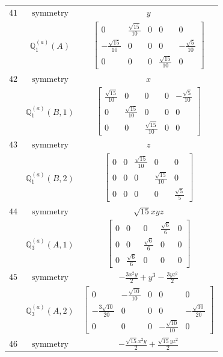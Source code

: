 \documentclass[fleqn,8pt,landscape]{jsarticle}
\begin{document}
\begin{longtable}{ccc}
$ 41 $ & $ \text{symmetry} $ & $ y $ \\
$  $ & $ \mathbb{Q}_{1}^{(a)}(A) $ & $ \begin{bmatrix} 0 & \frac{\sqrt{15}}{10} & 0 & 0 & 0 \\ - \frac{\sqrt{15}}{10} & 0 & 0 & 0 & - \frac{\sqrt{5}}{10} \\ 0 & 0 & 0 & \frac{\sqrt{15}}{10} & 0 \end{bmatrix} $ \\ \hline
$ 42 $ & $ \text{symmetry} $ & $ x $ \\
$  $ & $ \mathbb{Q}_{1}^{(a)}(B,1) $ & $ \begin{bmatrix} \frac{\sqrt{15}}{10} & 0 & 0 & 0 & - \frac{\sqrt{5}}{10} \\ 0 & \frac{\sqrt{15}}{10} & 0 & 0 & 0 \\ 0 & 0 & \frac{\sqrt{15}}{10} & 0 & 0 \end{bmatrix} $ \\ \hline
$ 43 $ & $ \text{symmetry} $ & $ z $ \\
$  $ & $ \mathbb{Q}_{1}^{(a)}(B,2) $ & $ \begin{bmatrix} 0 & 0 & \frac{\sqrt{15}}{10} & 0 & 0 \\ 0 & 0 & 0 & \frac{\sqrt{15}}{10} & 0 \\ 0 & 0 & 0 & 0 & \frac{\sqrt{5}}{5} \end{bmatrix} $ \\ \hline
$ 44 $ & $ \text{symmetry} $ & $ \sqrt{15} x y z $ \\
$  $ & $ \mathbb{Q}_{3}^{(a)}(A,1) $ & $ \begin{bmatrix} 0 & 0 & 0 & \frac{\sqrt{6}}{6} & 0 \\ 0 & 0 & \frac{\sqrt{6}}{6} & 0 & 0 \\ 0 & \frac{\sqrt{6}}{6} & 0 & 0 & 0 \end{bmatrix} $ \\ \hline
$ 45 $ & $ \text{symmetry} $ & $ - \frac{3 x^{2} y}{2} + y^{3} - \frac{3 y z^{2}}{2} $ \\
$  $ & $ \mathbb{Q}_{3}^{(a)}(A,2) $ & $ \begin{bmatrix} 0 & - \frac{\sqrt{10}}{10} & 0 & 0 & 0 \\ - \frac{3 \sqrt{10}}{20} & 0 & 0 & 0 & - \frac{\sqrt{30}}{20} \\ 0 & 0 & 0 & - \frac{\sqrt{10}}{10} & 0 \end{bmatrix} $ \\ \hline
$ 46 $ & $ \text{symmetry} $ & $ - \frac{\sqrt{15} x^{2} y}{2} + \frac{\sqrt{15} y z^{2}}{2} $ \\

\end{longtable}
\end{document}
